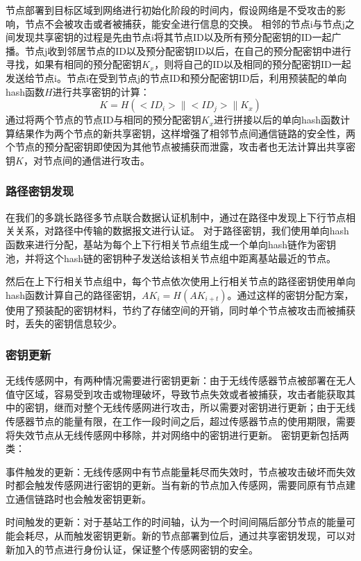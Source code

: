节点部署到目标区域到网络进行初始化阶段的时间内，假设网络是不受攻击的影响，节点不会被攻击或者被捕获，能安全进行信息的交换。
相邻的节点i与节点j之间发现共享密钥的过程是先由节点i将其节点ID以及所有预分配密钥的ID一起广播。节点j收到邻居节点的ID以及预分配密钥ID以后，在自己的预分配密钥中进行寻找，如果有相同的预分配密钥$K_x$，则将自己的ID以及相同的预分配密钥ID一起发送给节点i。节点i在受到节点j的节点ID和预分配密钥ID后，利用预装配的单向hash函数$H$进行共享密钥的计算：
\begin{equation}
  K=H(<ID_i>\| <ID_j> \|K_x)
\end{equation}
通过将两个节点的节点ID与相同的预分配密钥$K_x$进行拼接以后的单向hash函数计算结果作为两个节点的新共享密钥，这样增强了相邻节点间通信链路的安全性，两个节点的预分配密钥即使因为其他节点被捕获而泄露，攻击者也无法计算出共享密钥$K$，对节点间的通信进行攻击。
\subsubsection{路径密钥发现}
在我们的多跳长路径多节点联合数据认证机制中，通过在路径中发现上下行节点相关关系，对路径中传输的数据报文进行认证。
对于路径密钥，我们使用单向hash函数来进行分配，基站为每个上下行相关节点组生成一个单向hash链作为密钥池，并将这个hash链的密钥种子发送给该相关节点组中距离基站最近的节点。

然后在上下行相关节点组中，每个节点依次使用上行相关节点的路径密钥使用单向hash函数计算自己的路径密钥，$AK_i=H(AK_{i+t})$。通过这样的密钥分配方案，使用了预装配的密钥材料，节约了存储空间的开销，同时单个节点被攻击而被捕获时，丢失的密钥信息较少。
\subsubsection{密钥更新}
无线传感网中，有两种情况需要进行密钥更新：由于无线传感器节点被部署在无人值守区域，容易受到攻击或物理破坏，导致节点失效或者被捕获，攻击者能获取其中的密钥，继而对整个无线传感网进行攻击，所以需要对密钥进行更新；由于无线传感器节点的能量有限，在工作一段时间之后，超过传感器节点的使用期限，需要将失效节点从无线传感网中移除，并对网络中的密钥进行更新。
密钥更新包括两类：

事件触发的更新：无线传感网中有节点能量耗尽而失效时，节点被攻击破坏而失效时都会触发传感网进行密钥的更新。当有新的节点加入传感网，需要同原有节点建立通信链路时也会触发密钥更新。

时间触发的更新：对于基站工作的时间轴，认为一个时间间隔后部分节点的能量可能会耗尽，从而触发密钥更新。新的节点部署到位后，通过共享密钥发现，可以对新加入的节点进行身份认证，保证整个传感网密钥的安全。



